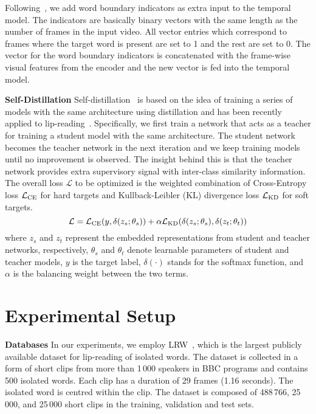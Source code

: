 \documentclass{article}
\begin{document}
Following~\cite{DBLP:journals/corr/abs-2011-07557, stafylakis18}, we add word boundary indicators as extra input to the temporal model. The indicators are basically  binary vectors with the same length as the number of frames in the input video. All vector entries which correspond to frames where the target word is present are set to 1 and the rest are set to 0. The vector for the word boundary indicators is concatenated with the frame-wise visual features from the encoder and the new vector is fed into the temporal model.

\noindent\textbf{Self-Distillation}\quad
Self-distillation~\cite{furlanello2018born} is based on the idea of training a series of models with the same architecture using distillation and has been recently applied to lip-reading~\cite{ma2020towards}. Specifically, we first train a network that acts as a teacher for training a student model with the same architecture.
The student network becomes the teacher network in the next iteration and we keep training models until no improvement is observed. The insight behind this is that the teacher network provides extra supervisory signal with inter-class similarity information.
The overall loss $\mathcal{L}$ to be optimized is the weighted combination of Cross-Entropy loss $\mathcal{L}_{{\rm CE}}$ for hard targets and Kullback-Leibler (KL) divergence loss $\mathcal{L}_{{\rm KD}}$ for soft targets.
\begin{equation}
\mathcal{L} = \mathcal{L}_{{\rm CE}}(y, \delta(z_s;\theta_s)) + \alpha \mathcal{L}_{{\rm KD}}(\delta(z_s;\theta_s), \delta(z_t;\theta_t))
\label{eq:KD_loss}
\end{equation}
where $z_s$ and $z_t$ represent the embedded representations from student and teacher networks, respectively, $\theta_s$ and $\theta_t$ denote learnable parameters of student and teacher models,  $y$ is the target label, $\delta(\cdot)$ stands for the softmax function, and $\alpha$ is the balancing weight between the two terms.


\section{Experimental Setup}

\noindent\textbf{Databases}\quad
In our experiments, we employ LRW~\cite{chung16}, which is the largest publicly available dataset for lip-reading of isolated words. The dataset is collected in a form of short clips from more than 1\,000 speakers in BBC programs and contains 500 isolated words.
Each clip has a duration of 29 frames (1.16 seconds). The isolated word is centred within the clip. The dataset is composed of 488\,766, 25\,000, and 25\,000 short clips in the training, validation and test sets.
\end{document}
